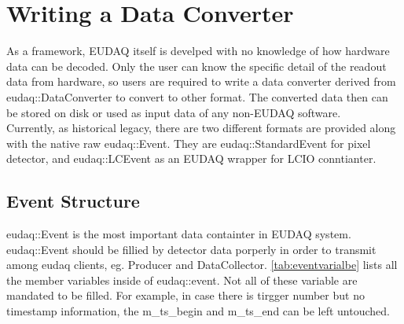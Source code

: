 \section{Writing a Data Converter}
As a framework, EUDAQ itself is develped with no knowledge of how hardware data can be decoded. Only the user can know the specific detail of the readout data from hardware, so users are required to write a data converter derived from eudaq::DataConverter to convert to other format. The converted data then can be stored on disk or used as input data of any non-EUDAQ software.\\

Currently, as historical legacy, there are two different formats are provided along with the native raw eudaq::Event. They are eudaq::StandardEvent for pixel detector, and eudaq::LCEvent as an EUDAQ wrapper for LCIO conntianter.

\subsection{Event Structure}
eudaq::Event is the most important data containter in EUDAQ system. eudaq::Event should be fillied by detector data porperly in order to transmit among eudaq clients, eg. Producer and DataCollector. \autoref{tab:eventvarialbe} lists all the member variables inside of eudaq::event. Not all of these variable are mandated to be filled. For example, in case there is tirgger number but no timestamp information, the m\_ts\_begin and m\_ts\_end can be left untouched.

